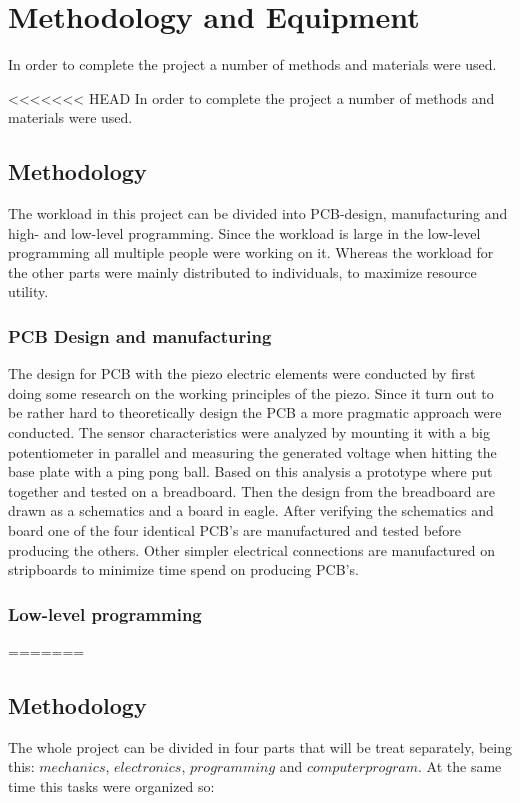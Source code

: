 \chapter{Methodology and Equipment}
\label{chap:methodology}
	In order to complete the project a number of methods and materials were used.

<<<<<<< HEAD
In order to complete the project a number of methods and materials were used.
\section{Methodology}
\label{sec:methodology}
The workload in this project can be divided into PCB-design, manufacturing and high- and low-level programming. Since the workload is large in the low-level programming all multiple people were working on it. Whereas the workload for the other parts were mainly distributed to individuals, to maximize resource utility.   

\subsection{PCB Design and manufacturing}
The design for PCB with the piezo electric elements were conducted by first doing some research on the working principles of the piezo. Since it turn out to be rather hard to theoretically design the PCB  a more pragmatic approach were conducted. 
The sensor characteristics were analyzed by mounting it with a big potentiometer in parallel and measuring the generated voltage when hitting the base plate with a ping pong ball.
Based on this analysis a prototype where put together and tested on a breadboard. 
Then the design from the breadboard are drawn as a schematics and a board in eagle. 
After verifying the schematics and board one of the four identical PCB's are manufactured and tested before producing the others.
Other simpler electrical connections are manufactured on stripboards to minimize time spend on producing PCB's.

\subsection{Low-level programming}
=======
	\section{Methodology}
	\label{sec:methodology}
		The whole project can be divided in four parts that will be treat separately, being this: $mechanics$, $electronics$, $programming$ and $computer program$. At the same time this tasks were organized so:

